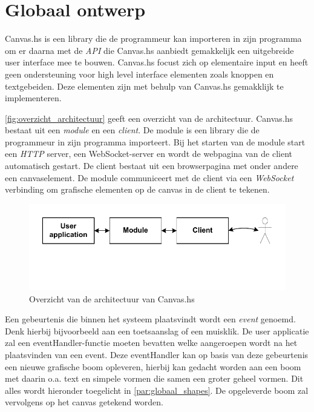 \section{Globaal ontwerp}  \label{sec:globaal}
Canvas.hs is een library die de programmeur kan importeren in zijn programma om er daarna met de \emph{API} die Canvas.hs aanbiedt gemakkelijk een uitgebreide user interface mee te bouwen. Canvas.hs focust zich op elementaire input en heeft geen ondersteuning voor high level interface elementen zoals knoppen en textgebeiden. Deze elementen zijn met behulp van Canvas.hs gemakklijk te implementeren.

\autoref{fig:overzicht_architectuur} geeft een overzicht van de architectuur. Canvas.hs bestaat uit een \emph{module} en een \emph{client}. De module is een library die de programmeur in zijn programma importeert. Bij het starten van de module start een \emph{HTTP} server, een WebSocket-server en wordt de webpagina van de client automatisch gestart. De client bestaat uit een browserpagina met onder andere een canvaselement. De module communiceert met de client via een \emph{WebSocket} verbinding om grafische elementen op de canvas in de client te tekenen.

\begin{figure}[H]
\begin{center}
\includegraphics[keepaspectratio,width=\textwidth]{./images/architecture_overzicht_poster.pdf}
\caption{Overzicht van de architectuur van Canvas.hs}
\label{fig:overzicht_architectuur}
\end{center}
\end{figure}

Een gebeurtenis die binnen het systeem plaatsvindt wordt een \emph{event} genoemd. Denk hierbij bijvoorbeeld aan een toetsaanslag of een muisklik. De user applicatie zal een eventHandler-functie moeten bevatten welke aangeroepen wordt na het plaatsvinden van een event. Deze eventHandler kan op basis van deze gebeurtenis een nieuwe grafische boom opleveren, hierbij kan gedacht worden aan een boom met daarin o.a. text en simpele vormen die samen een groter geheel vormen. Dit alles wordt hieronder toegelicht in \autoref{par:globaal_shapes}. De opgeleverde boom zal vervolgens op het canvas getekend worden. 

